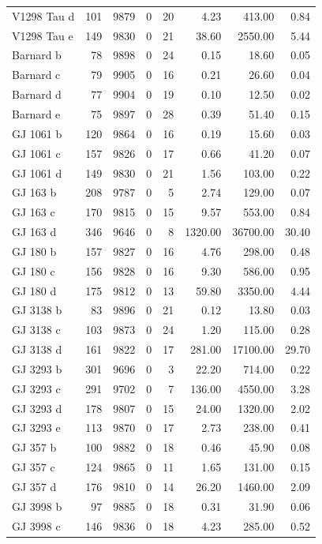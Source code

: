 \begin{table}
\begin{tabular}{lrrrrrrr}
V1298 Tau d & 101 & 9879 & 0 & 20 & 4.23 & 413.00 & 0.84 \\
V1298 Tau e & 149 & 9830 & 0 & 21 & 38.60 & 2550.00 & 5.44 \\
Barnard b & 78 & 9898 & 0 & 24 & 0.15 & 18.60 & 0.05 \\
Barnard c & 79 & 9905 & 0 & 16 & 0.21 & 26.60 & 0.04 \\
Barnard d & 77 & 9904 & 0 & 19 & 0.10 & 12.50 & 0.02 \\
Barnard e & 75 & 9897 & 0 & 28 & 0.39 & 51.40 & 0.15 \\
GJ 1061 b & 120 & 9864 & 0 & 16 & 0.19 & 15.60 & 0.03 \\
GJ 1061 c & 157 & 9826 & 0 & 17 & 0.66 & 41.20 & 0.07 \\
GJ 1061 d & 149 & 9830 & 0 & 21 & 1.56 & 103.00 & 0.22 \\
GJ 163 b & 208 & 9787 & 0 & 5 & 2.74 & 129.00 & 0.07 \\
GJ 163 c & 170 & 9815 & 0 & 15 & 9.57 & 553.00 & 0.84 \\
GJ 163 d & 346 & 9646 & 0 & 8 & 1320.00 & 36700.00 & 30.40 \\
GJ 180 b & 157 & 9827 & 0 & 16 & 4.76 & 298.00 & 0.48 \\
GJ 180 c & 156 & 9828 & 0 & 16 & 9.30 & 586.00 & 0.95 \\
GJ 180 d & 175 & 9812 & 0 & 13 & 59.80 & 3350.00 & 4.44 \\
GJ 3138 b & 83 & 9896 & 0 & 21 & 0.12 & 13.80 & 0.03 \\
GJ 3138 c & 103 & 9873 & 0 & 24 & 1.20 & 115.00 & 0.28 \\
GJ 3138 d & 161 & 9822 & 0 & 17 & 281.00 & 17100.00 & 29.70 \\
GJ 3293 b & 301 & 9696 & 0 & 3 & 22.20 & 714.00 & 0.22 \\
GJ 3293 c & 291 & 9702 & 0 & 7 & 136.00 & 4550.00 & 3.28 \\
GJ 3293 d & 178 & 9807 & 0 & 15 & 24.00 & 1320.00 & 2.02 \\
GJ 3293 e & 113 & 9870 & 0 & 17 & 2.73 & 238.00 & 0.41 \\
GJ 357 b & 100 & 9882 & 0 & 18 & 0.46 & 45.90 & 0.08 \\
GJ 357 c & 124 & 9865 & 0 & 11 & 1.65 & 131.00 & 0.15 \\
GJ 357 d & 176 & 9810 & 0 & 14 & 26.20 & 1460.00 & 2.09 \\
GJ 3998 b & 97 & 9885 & 0 & 18 & 0.31 & 31.90 & 0.06 \\
GJ 3998 c & 146 & 9836 & 0 & 18 & 4.23 & 285.00 & 0.52 \\

\end{tabular}
\end{table}
